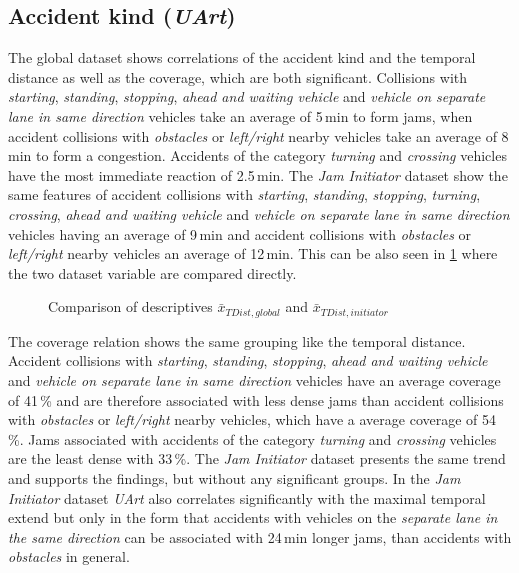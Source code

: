 \subsection{Accident kind (\textit{UArt})}
\label{analysis_sum_UArt}
The global dataset shows correlations of the accident kind and the temporal distance as well as the coverage, which are both significant. Collisions with \textit{starting}, \textit{standing}, \textit{stopping}, \textit{ahead and waiting vehicle} and \textit{vehicle on separate lane in same direction} vehicles take an average of 5\,min to form jams, when accident collisions with \textit{obstacles} or \textit{left/right} nearby vehicles take an average of 8\,min to form a congestion. Accidents of the category \textit{turning} and \textit{crossing} vehicles have the most immediate reaction of 2.5\,min. The \textit{Jam Initiator} dataset show the same features of accident collisions with \textit{starting}, \textit{standing}, \textit{stopping}, \textit{turning}, \textit{crossing}, \textit{ahead and waiting vehicle} and \textit{vehicle on separate lane in same direction} vehicles having an average of 9\,min and accident collisions with \textit{obstacles} or \textit{left/right} nearby vehicles an average of 12\,min. This can be also seen in \cref{fig:baysis_summary_UArt1_TDist_barplot} where the two dataset variable are compared directly.
\begin{figure}[ht!]
    \data
    \pgfplotstablesort[sort key=means, sort cmp=float >]{\datasorted}{\data}
    \tiny
    \centering
    \caption{Comparison of descriptives $\bar{x}_{TDist,global}$ and $\bar{x}_{TDist,initiator}$}
    \label{fig:baysis_summary_UArt1_TDist_barplot}
\end{figure}
The coverage relation shows the same grouping like the temporal distance. Accident collisions with \textit{starting}, \textit{standing}, \textit{stopping}, \textit{ahead and waiting vehicle} and \textit{vehicle on separate lane in same direction} vehicles have an average coverage of 41\,\% and are therefore associated with less dense jams than accident collisions with \textit{obstacles} or \textit{left/right} nearby vehicles, which have a average coverage of 54\,\%. Jams associated with accidents of the category \textit{turning} and \textit{crossing} vehicles are the least dense with 33\,\%. The \textit{Jam Initiator} dataset presents the same trend and supports the findings, but without any significant groups. In the \textit{Jam Initiator} dataset \textit{UArt} also correlates significantly with the maximal temporal extend but only in the form that accidents with vehicles on the \textit{separate lane in the same direction} can be associated with 24\,min longer jams, than accidents with \textit{obstacles} in general.

